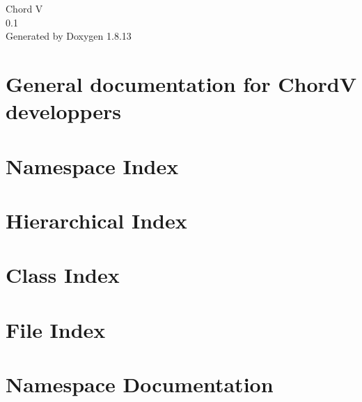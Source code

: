 \documentclass[twoside]{book}
\newcommand{\+}{\discretionary{\mbox{\scriptsize$\hookleftarrow$}}{}{}}
\newcommand{\clearemptydoublepage}{%
  \newpage{\pagestyle{empty}\cleardoublepage}%
}
\begin{document}
\begin{titlepage}
\vspace*{7cm}
\begin{center}%
{\Large Chord V \\[1ex]\large 0.\+1 }\\
\vspace*{1cm}
{\large Generated by Doxygen 1.8.13}\\
\end{center}
\end{titlepage}
\clearemptydoublepage
{}
\tableofcontents
\clearemptydoublepage
{}

\chapter{General documentation for ChordV developpers}
\label{index}
\chapter{Namespace Index}

\chapter{Hierarchical Index}

\chapter{Class Index}

\chapter{File Index}

\chapter{Namespace Documentation}

\end{document}
